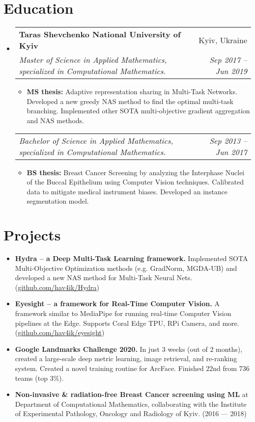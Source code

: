 \documentclass[letterpaper,11pt]{article}
\makeatletter
\newcommand{\resumeItemWithHeader}[2]{
  \item[--]\small{
    \textbf{#1}{ #2 \vspace{-2pt}}
  }
}
\newcommand{\resumeSubheading}[4]{
  \vspace{-1pt}\item
    \begin{tabular*}{0.97\textwidth}{l@{\extracolsep{\fill}}r}
      \textbf{#1} & #2 \\
      \textit{\small#3} & \textit{\small #4} \\
    \end{tabular*}\vspace{-5pt}
}
\newcommand{\resumeSubheadingSection}[2]{
  \vspace{-1pt}
    \begin{tabular*}{0.97\textwidth}{l@{\extracolsep{\fill}}r}
      \textit{\small#1} & \textit{\small #2} \\
    \end{tabular*}\vspace{-5pt}
}
\newcommand{\resumeSubItem}[2]{\resumeItemWithHeader{#1}{#2}\vspace{-4pt}}
\newcommand{\resumeSubHeadingListStart}{\begin{itemize}[leftmargin=*]}
\newcommand{\resumeSubHeadingListEnd}{\end{itemize}}
\newcommand{\resumeItemListStart}{\begin{itemize}[leftmargin=*]}
\newcommand{\resumeItemListEnd}{\end{itemize}\vspace{-5pt}}
\makeatother
\begin{document}
\section{Education}
  \resumeSubHeadingListStart
    \resumeSubheading
      {Taras Shevchenko National University of Kyiv}{Kyiv, Ukraine}
      {Master of Science in Applied Mathematics, specialized in Computational Mathematics.}
      {Sep 2017 -- Jun 2019}
      \resumeItemListStart
        \resumeItemWithHeader{MS thesis:}{Adaptive representation sharing in Multi-Task Networks. Developed a new greedy NAS method to find the optimal multi-task branching. Implemented other SOTA multi-objective gradient aggregation and NAS methods.}
      \resumeItemListEnd
    \resumeSubheadingSection
      {Bachelor of Science in Applied Mathematics, specialized in Computational Mathematics.}
      {Sep 2013 -- Jun 2017}
      \resumeItemListStart
        \resumeItemWithHeader{BS thesis:}{Breast Cancer Screening by analyzing the Interphase Nuclei of the Buccal Epithelium using Computer Vision techniques. Calibrated data to mitigate medical instrument biases. Developed an instance segmentation model.}
      \resumeItemListEnd
  \resumeSubHeadingListEnd


\section{Projects}
  \resumeSubHeadingListStart
    \resumeSubItem{Hydra -- a Deep Multi-Task Learning framework.}
      {Implemented SOTA Multi-Objective Optimization methods (e.g. GradNorm, MGDA-UB) and developed a new NAS method for Multi-Task Neural Nets.  (\href{https://github.com/hav4ik/Hydra}{github.com/hav4ik/Hydra})}
    \resumeSubItem{Eyesight -- a framework for Real-Time Computer Vision.}
      {A framework similar to MediaPipe for running real-time Computer Vision pipelines at the Edge. Supports Coral Edge TPU, RPi Camera, and more. (\href{https://github.com/hav4ik/eyesight}{github.com/hav4ik/eyesight})}
    \resumeSubItem{Google Landmarks Challenge 2020.}{In just 3 weeks (out of 2 months), created a large-scale deep metric learning, image retrieval, and re-ranking system. Created a novel training routine for ArcFace. Finished 22nd from 736 teams (top 3\%).}
    \resumeSubItem{Non-invasive \& radiation-free Breast Cancer screening using ML}
      {at Department of Computational Mathematics, collaborating with the Institute of Experimental Pathology, Oncology and Radiology of Kyiv. (2016 --- 2018)}
  \resumeSubHeadingListEnd
\end{document}
